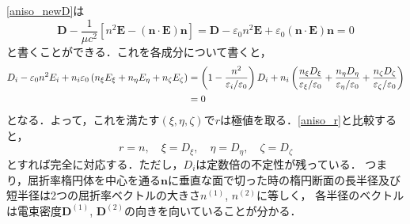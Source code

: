 \eqref{aniso_newD}は
\[
\boldsymbol{D}-\dfrac{1}{\mu{c}^2}\left[n^2\boldsymbol{E}-(\boldsymbol{n}\cdot\boldsymbol{E})\boldsymbol{n}\right]
= \boldsymbol{D}-\varepsilon_0n^2\boldsymbol{E}+\varepsilon_0(\boldsymbol{n}\cdot\boldsymbol{E})\boldsymbol{n} = 0
\]
と書くことができる．これを各成分について書くと，
\begin{align}
  D_i-\varepsilon_0n^2E_i+n_i\varepsilon_0\left(n_\xi{}E_\xi+n_\eta{}E_\eta+n_\zeta{}E_\zeta\right)
  &= \left(1-\dfrac{n^2}{\varepsilon_i/\varepsilon_0}\right)D_i+n_i\left(\dfrac{n_\xi{}D_\xi}{\varepsilon_\xi/\varepsilon_0}+\dfrac{n_\eta{}D_\eta}{\varepsilon_\eta/\varepsilon_0}+\dfrac{n_\zeta{}D_\zeta}{\varepsilon_\zeta/\varepsilon_0}\right)\notag\\
  &=0
\end{align}
となる．よって，これを満たす$(\xi,\eta,\zeta)$で$r$は極値を取る．\eqref{aniso_r}と比較すると，
\[r = n, \quad \xi=D_\xi , \quad \eta=D_\eta , \quad \zeta=D_\zeta\]
とすれば完全に対応する．ただし，$D_i$は定数倍の不定性が残っている．
つまり，屈折率楕円体を中心を通る$\boldsymbol{n}$に垂直な面で切った時の楕円断面の長半径及び短半径は2つの屈折率ベクトルの大きさ$n^{(1)}$, $n^{(2)}$に等しく，
各半径のベクトルは電束密度$\boldsymbol{D}^{(1)}$, $\boldsymbol{D}^{(2)}$の向きを向いていることが分かる．

